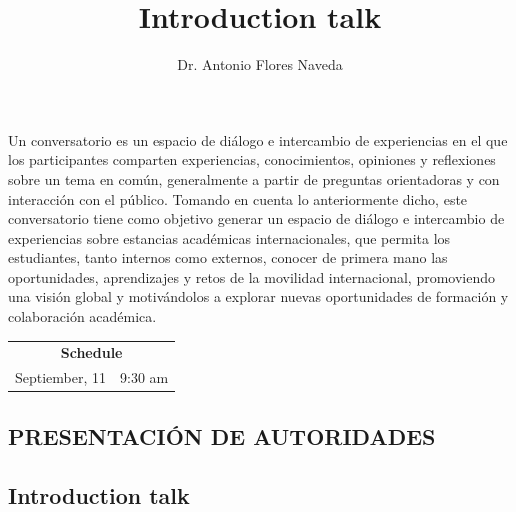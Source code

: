 \begin{browserSubsections}
\begingroup
\authorbookmarkfalse
\maketitle
\endgroup

Un conversatorio es un espacio de diálogo e intercambio de experiencias en el que los participantes comparten experiencias, conocimientos, opiniones y reflexiones sobre un tema en común, generalmente a partir de preguntas orientadoras y con interacción con el público. Tomando en cuenta lo anteriormente dicho, este conversatorio tiene como objetivo generar un espacio de diálogo e intercambio de experiencias sobre estancias académicas internacionales, que permita los estudiantes, tanto internos como externos, conocer de primera mano las oportunidades, aprendizajes y retos de la movilidad internacional, promoviendo una visión global y motivándolos a explorar nuevas oportunidades de formación y colaboración académica.

\begin{table}[H]
	\centering
	\begin{tabular}{cc}
		\multicolumn{2}{c}{\textbf{Schedule}} \\
		\multicolumn{1}{c|}{\multirow{1}{*}{Septiember, 11}} & 9:30 am \\
	\end{tabular}
\end{table}

\section*{PRESENTACIÓN DE AUTORIDADES}
\vspace{1.5cm}

\begin{wrap}
	\chapter{Introduction talk}
\end{wrap}
\cero
\author{%
	Dr. Antonio Flores Naveda
}
\corresponding{}{}
\title{Introduction talk}


\end{browserSubsections}
